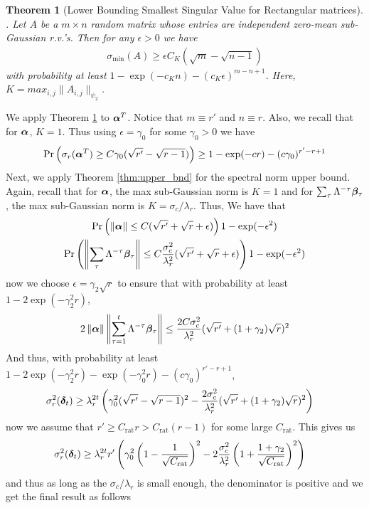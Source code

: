 \documentclass[10pt]{article}
\newtheorem{theorem}{Theorem}
\newcommand{\norm}[1]{\left\|#1\right\|}
\begin{document}
\begin{theorem}[Lower Bounding Smallest Singular Value for Rectangular matrices]\label{thm:lower_bnd_rect}.
Let $A$ be a $m \times n$ random matrix whose entries are independent zero-mean sub-Gaussian r.v.'s. Then for any $\epsilon >0$ we have 
\begin{align*}
\sigma_{\min}(A) \geq \epsilon C_K(\sqrt{m} - \sqrt{n-1}) 
\end{align*}
with probability at least $1 -  \exp(-c_K n) - (c_K \epsilon)^{m -n +1}$. Here, $K = max_{i,j} \|A_{i,j}\|_{\psi_2}$. 
\end{theorem} 
We apply Theorem \ref{thm:lower_bnd_rect} to $\bm{\alpha}^T$. Notice that $m \equiv r'$ and $n \equiv r$. Also, we recall that for $\bm{\alpha}$, $K = 1$. Thus using $\epsilon = \gamma_0$ for some $\gamma_0 > 0$ we have
\begin{gather*}
\Pr\left(\sigma_{r}(\bm{\alpha}^T) \geq C \gamma_0(\sqrt{r'} - \sqrt{r-1})\right) \geq  1 - \exp(-c r) - (c \gamma_0)^{r'-r+1}
\end{gather*}
Next, we apply Theorem \ref{thm:upper_bnd} for the spectral norm upper bound. Again, recall that for $\bm{\alpha}$, the max sub-Gaussian norm is $K=1 $ and for $\sum_{\tau} \Lambda^{-\tau} \bm{\beta}_\tau $, the max sub-Gaussian norm is $K = \sigma_c/\lambda_r$. Thus, We have that %
\begin{gather*}
\Pr\left( \norm{\ucos} \leq C (\sqrt{r'} + \sqrt{r} +\epsilon) \right) 1 - \exp(-\epsilon^2) \\
\Pr\left( \norm{\sum_\tau \Lambda^{-\tau} \wcos_\tau } \leq C \frac{\sigma_c^2}{\lambda_r^2} (\sqrt{r'} + \sqrt{r} +\epsilon) \right) 1 - \exp(-\epsilon^2) 
\end{gather*}
now we choose $\epsilon = \gamma_2 \sqrt{r}$ to ensure that with probability at least $1 - 2 \exp(-\gamma_2^2 r)$,
\begin{align*}
2\norm{\ucos}\norm{\sum_{\tau=1}^t \Lambda^{-\tau} \wcos_\tau} \leq \frac{2C \sigma_c^2}{\lambda_r^2} (\sqrt{r'} + (1+ \gamma_2)\sqrt{r})^2
\end{align*}
And thus, with probability at least $1 - 2\exp(-\gamma_2^2 r) - \exp(-\gamma_0^2 r) - (c \gamma_0)^{r' - r + 1}$, 
\begin{align*}
\sigma_r^2(\bm{\delta}_t) &\geq \lambda_r^{2t} \left( \gamma_0^2 (\sqrt{r'} - \sqrt{r-1})^2 - \frac{2 \sigma_c^2}{\lambda_r^2} (\sqrt{r'} + (1+\gamma_2)\sqrt{r})^2 \right)
\end{align*} 
\newcommand{\rat}{\mathrm{rat}}
now we assume that $r' \geq C_{\rat} r > C_{\rat}(r- 1)$ for some large $C_{\rat}$. This gives us
\begin{align*}
\sigma_r^2(\utcos_t) &\geq \lambda_r^{2t} r' \left(  \gamma_0^2 \left(1- \frac{1}{\sqrt{C_{\rat}}}\right)^2 - 2 \frac{\sigma_c^2}{\lambda_r^2} \left( 1 + \frac{1 + \gamma_2}{\sqrt{C_{\rat}}}\right)^2 \right)
\end{align*}
and thus as long as the $\sigma_c/\lambda_r$ is small enough, the denominator is positive and we get the final result as follows
\end{document}
